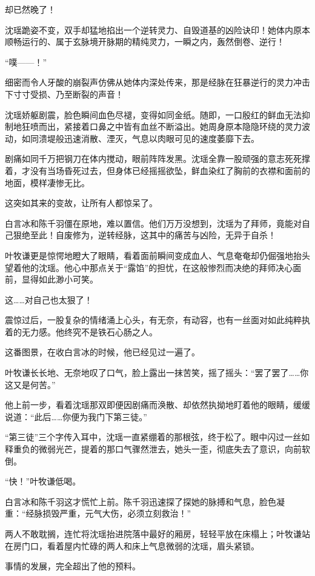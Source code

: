 却已然晚了！

沈瑶跪姿不变，双手却猛地掐出一个逆转灵力、自毁道基的凶险诀印！她体内原本顺畅运行的、属于玄脉境开脉期的精纯灵力，一瞬之内，轰然倒卷、逆行！

“噗——！”

细密而令人牙酸的崩裂声仿佛从她体内深处传来，那是经脉在狂暴逆行的灵力冲击下寸寸受损、乃至断裂的声音！

沈瑶娇躯剧震，脸色瞬间血色尽褪，变得如同金纸。随即，一口殷红的鲜血无法抑制地狂喷而出，紧接着口鼻之中皆有血丝不断溢出。她周身原本隐隐环绕的灵力波动，如同溃堤般迅速消散、湮灭，气息以肉眼可见的速度萎靡下去。

剧痛如同千万把钢刀在体内搅动，眼前阵阵发黑。沈瑶全靠一股顽强的意志死死撑着，才没有当场昏死过去，但身体已经摇摇欲坠，鲜血染红了胸前的衣襟和面前的地面，模样凄惨无比。

这突如其来的变故，让所有人都惊呆了。

白言冰和陈千羽僵在原地，难以置信。他们万万没想到，沈瑶为了拜师，竟能对自己狠绝至此！自废修为，逆转经脉，这其中的痛苦与凶险，无异于自杀！

叶牧谦更是惊愕地瞪大了眼睛，看着面前瞬间变成血人、气息奄奄却仍倔强地抬头望着他的沈瑶。他心中那点关于“露馅”的担忧，在这般惨烈而决绝的拜师决心面前，显得如此渺小可笑。

这……对自己也太狠了！

震惊过后，一股复杂的情绪涌上心头，有无奈，有动容，也有一丝面对如此纯粹执着的无力感。他终究不是铁石心肠之人。

这番图景，在收白言冰的时候，他已经见过一遍了。

叶牧谦长长地、无奈地叹了口气，脸上露出一抹苦笑，摇了摇头：“罢了罢了……你这又是何苦。”

他上前一步，看着沈瑶那双即便因剧痛而涣散、却依然执拗地盯着他的眼睛，缓缓说道：“此后……你便为我门下第三徒。”

“第三徒”三个字传入耳中，沈瑶一直紧绷着的那根弦，终于松了。眼中闪过一丝如释重负的微弱光芒，提着的那口气骤然泄去，她头一歪，彻底失去了意识，向前软倒。

“快！”叶牧谦低喝。

白言冰和陈千羽这才慌忙上前。陈千羽迅速探了探她的脉搏和气息，脸色凝重：“经脉损毁严重，元气大伤，必须立刻救治！”

两人不敢耽搁，连忙将沈瑶抬进院落中最好的厢房，轻轻平放在床榻上；叶牧谦站在房门口，看着屋内忙碌的两人和床上气息微弱的沈瑶，眉头紧锁。

事情的发展，完全超出了他的预料。

\vspace{2em}

